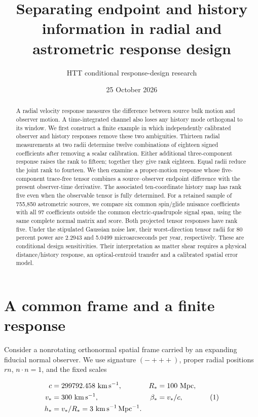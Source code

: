 \documentclass[aps,prd,preprint,onecolumn,notitlepage]{revtex4-2}
\begin{document}
\title{Separating endpoint and history information in radial and astrometric response design}
\author{HTT conditional response-design research}
\noaffiliation
\date{25 October 2026}
\begin{abstract}
A radial velocity response measures the difference between source bulk motion and observer motion. A time-integrated channel also loses any history mode orthogonal to its window. We first construct a finite example in which independently calibrated observer and history responses remove these two ambiguities. Thirteen radial measurements at two radii determine twelve combinations of eighteen signed coefficients after removing a scalar calibration. Either additional three-component response raises the rank to fifteen; together they give rank eighteen. Equal radii reduce the joint rank to fourteen. We then examine a proper-motion response whose five-component trace-free tensor combines a source–observer endpoint difference with the present observer-time derivative. The associated ten-coordinate history map has rank five even when the observable tensor is fully determined. For a retained sample of 755,850 astrometric sources, we compare six common spin/glide nuisance coefficients with all 97 coefficients outside the common electric-quadrupole signal span, using the same complete normal matrix and score. Both projected tensor responses have rank five. Under the stipulated Gaussian noise law, their worst-direction tensor radii for 80 percent power are 2.2943 and 5.0499 microarcseconds per year, respectively. These are conditional design sensitivities. Their interpretation as matter shear requires a physical distance/history response, an optical-centroid transfer and a calibrated spatial error model.
\end{abstract}
\maketitle
\hypertarget{a-common-frame-and-a-finite-response}{%
\section{A common frame and a finite response}\label{a-common-frame-and-a-finite-response}}

Consider a nonrotating orthonormal spatial frame carried by an expanding fiducial normal observer. We use signature \((-+++ )\), proper radial positions \(r n\), \(n\cdot n=1\), and the fixed scales

\[
\begin{aligned}
c &= 299792.458\ {\rm km\,s^{-1}}, & R_* &= 100\ {\rm Mpc},\\
v_* &= 300\ {\rm km\,s^{-1}}, & \beta_* &= v_*/c,\\
h_* &= v_*/R_* = 3\ {\rm km\,s^{-1}\,Mpc^{-1}}.
\end{aligned}\tag{1}
\]
\end{document}
